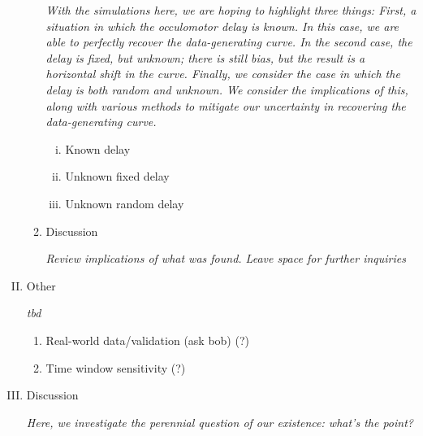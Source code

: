 \documentclass[12pt, letterpaper, twoside]{article}
\begin{document}
\begin{enumerate}[I.]
\begin{enumerate}[1.]
\textit{With the simulations here, we are hoping to highlight three things: First, a situation in which the occulomotor delay is known. In this case, we are able to perfectly recover the data-generating curve. In the second case, the delay is fixed, but unknown; there is still bias, but the result is a horizontal shift in the curve. Finally, we consider the case in which the delay is both random and unknown. We consider the implications of this, along with various methods to mitigate our uncertainty in recovering the data-generating curve.}
  
    \begin{enumerate}[i.]
    \item Known delay
    \item Unknown fixed delay
    \item Unknown random delay
    \end{enumerate}
  \item Discussion

  \textit{Review implications of what was found. Leave space for further inquiries}  
  
  \end{enumerate}
\item Other

\textit{tbd}
  \begin{enumerate}[1.]
  \item Real-world data/validation (ask bob) (?)
  \item Time window sensitivity (?)
  \end{enumerate}
\item Discussion

\textit{Here, we investigate the perennial question of our existence: what's the point?}

\end{enumerate}
\end{document}
